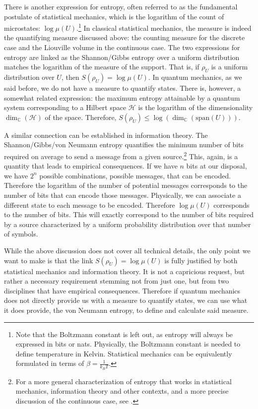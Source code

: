 \documentclass[10pt,twocolumn, nofootinbib]{revtex4-2}
\begin{document}
There is another expression for entropy, often referred to as the fundamental postulate of statistical mechanics, \cite{Peliti2011} which is the logarithm of the count of microstates: $\log \mu(U)$.\footnote{Note that the Boltzmann constant is left out, as entropy will always be expressed in bits or nats. Physically, the Boltzmann constant is needed to define temperature in Kelvin. Statistical mechanics can be equivalently formulated in terms of $\beta = \frac{1}{k_B T}$.\cite{chyla2011evolution}} In classical statistical mechanics, the measure is indeed the quantifying measure discussed above: the counting measure for the discrete case and the Liouville volume in the continuous case. The two expressions for entropy are linked as the Shannon/Gibbs entropy over a uniform distribution matches the logarithm of the measure of the support. That is, if $\rho_U$ is a uniform distribution over $U$, then $S(\rho_U) = \log \mu(U)$. In quantum mechanics, as we said before, we do not have a measure to quantify states. There is, however, a somewhat related expression: the maximum entropy attainable by a quantum system corresponding to a Hilbert space $\mathcal{H}$ is the logarithm of the dimensionality $\dim_{\mathbb{C}}(\mathcal{H})$ of the space. Therefore, $ S(\rho_U) \leq \log (\dim_{\mathbb{C}}(\text{span}(U)))$.

A similar connection can be established in information theory. The Shannon/Gibbs/von Neumann entropy quantifies the minimum number of bits required on average to send a message from a given source.\footnote{For a more general characterization of entropy that works in statistical mechanics, information theory and other contexts, and a more precise discussion of the continuous case, see \cite{aop-phys-variability}.} This, again, is a quantity that leads to empirical consequences. If we have $n$ bits at our disposal, we have $2^n$ possible combinations, possible messages, that can be encoded. Therefore the logarithm of the number of potential messages corresponds to the number of bits that can encode those messages. Physically, we can associate a different state to each message to be encoded. Therefore $\log \mu(U)$ corresponds to the number of bits. This will exactly correspond to the number of bits required by a source characterized by a uniform probability distribution over that number of symbols.

While the above discussion does not cover all technical details, the only point we want to make is that the link $S(\rho_U) = \log \mu(U)$ is fully justified by both statistical mechanics and information theory. It is not a capricious request, but rather a necessary requirement stemming not from just one, but from two disciplines that have empirical consequences. Therefore if quantum mechanics does not directly provide us with a measure to quantify states, we can use what it does provide, the von Neumann entropy, to define and calculate said measure.
\end{document}
